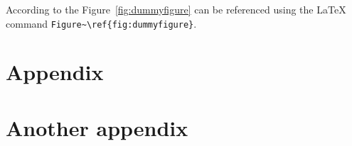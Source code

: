 \documentclass{tut-thesis}
\begin{document}
\blindtext %

According to \textcite{Doe2015} the Figure~\ref{fig:dummyfigure} can be referenced using the \LaTeX{} command \verb|Figure~\ref{fig:dummyfigure}|.
\blindmathpaper %

\printbibliography

\begin{appendices}
\chapter{Appendix}
\blindtext %
\chapter{Another appendix}
\blindtext
\end{appendices}
\end{document}
